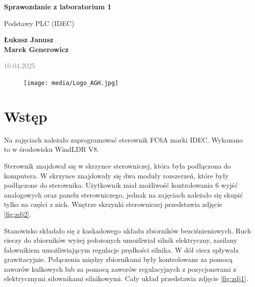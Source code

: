 \documentclass{article}
\begin{document}
\begin{titlepage}
    \begin{center}
        \vspace*{1cm}
            
        \Huge
        \textbf{Sprawozdanie z laboratorium 1}
            
        \vspace{0.5cm}
        \LARGE
        Podstawy PLC (IDEC)
            
        \vspace{1.5cm}
            
        \textbf{Łukasz Janusz\\Marek Generowicz}

        \normalsize      
        \textcolor{gray}{10.04.2025}
        \vfill
        \begin{figure}[hb]
            \centering
            \texttt{[image: media/Logo\_AGH.jpg]}
        \end{figure}   
    \end{center}
\end{titlepage}

\newpage
\section{Wstęp}
Na zajęciach należało zaprogramować sterownik FC6A marki IDEC. Wykonano to w środowisku WindLDR V8.

Sterownik znajdował się w skrzynce sterowniczej, która była podłączona do komputera. W skrzynce znajdowały się dwa moduły rozszerzeń, które były podłączone do sterownika. Użytkownik miał możliwość kontrolowania 6 wyjść analogowych oraz panelu sterowniczego, jednak na zajęciach należało się skupić tylko na części z nich. Wnętrze skrzynki sterowniczej przedstawia zdjęcie \ref{fig:zdj2}.

Stanowisko składało się z kaskadowego układu zbiorników bezciśnieniowych. Ruch cieczy do zbiorników wyżej położonych umożliwiał silnik elektryczny, zasilany falownikiem umożliwiającym regulacje prędkości silnika. W dół ciecz spływała grawitacyjnie. Połączenia między zbiornikami były kontrolowane za pomocą zaworów kulkowych lub za pomocą zaworów regulacyjnych z pozycjonerami z elektrycznymi siłownikami silnikowymi. Cały układ przedstawia zdjęcie \ref{fig:zdj1}. 
\end{document}
